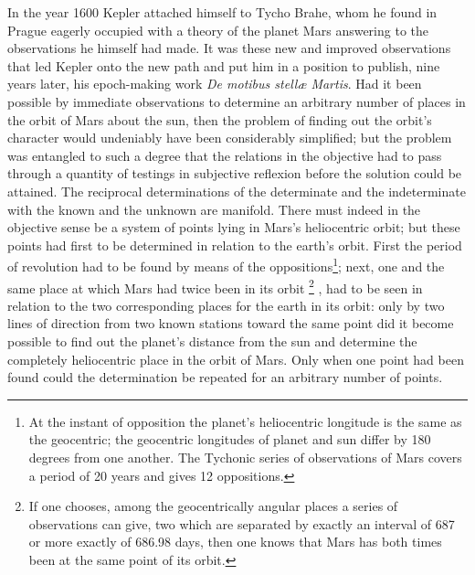 \documentclass[12pt,a4paper]{book}
\renewcommand{\thefootnote}{*)}
\begin{document}
In the year 1600 Kepler attached himself to Tycho Brahe, whom he found in Prague eagerly occupied with a
theory of the planet Mars answering to the observations he himself
had made. It was these new and improved observations that led Kepler onto the new path and put him in a
position to publish, nine years later, his epoch-making work
\textit{De motibus stellæ Martis}. Had it been possible by immediate observations to determine an
arbitrary number of places in the orbit of Mars about the sun, then the problem of finding out the orbit's
character would undeniably have been considerably simplified; but the problem was entangled to such a
degree that the relations in the objective had to pass through a quantity of testings in subjective
reflexion before the solution could be attained. The reciprocal determinations of the determinate and the
indeterminate with the known and the unknown are manifold. There must indeed in the objective sense be a
system of points lying in Mars's heliocentric orbit; but these points had first to be determined in
relation to the earth's orbit. First the period of revolution had to be found by means of the
oppositions\footnote{%
At the instant of opposition the planet's heliocentric longitude is the same as the geocentric; the
geocentric longitudes of planet and sun differ by 180 degrees from one another. The Tychonic series of
observations of Mars covers a period of 20 years and gives 12 oppositions.}; next, one and the same place
at which Mars had twice been in its orbit%
\renewcommand{\thefootnote}{**)}%
\footnote{%
If one chooses, among the geocentrically angular places a series of observations can give, two which are
separated by exactly an interval of 687 or more exactly of 686.98 days, then one knows that Mars has both
times been at the same point of its orbit.}%
\renewcommand{\thefootnote}{*)}%
, had to be seen in relation to the two corresponding places for the earth in its orbit: only by two lines
of direction from two known stations toward the same point did it become possible to find out the planet's
distance from the sun and determine the completely heliocentric place in the orbit of Mars. Only when one
point had been found could the determination be repeated for an arbitrary number of points.
\end{document}
